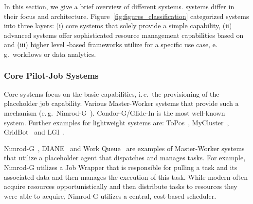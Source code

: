 \documentclass{sig-alternate}
\begin{document}
In this section, we give a brief overview of different \pilotjob systems.
\pilotjob systems differ in their focus and architecture.
Figure~\ref{fig:figures_classification} categorized \pilotjob systems into
three layers: (i) core \pilotjob systems that solely provide a simple \pilot
capability, (ii) advanced \pilotjob systems offer sophisticated resource
management capabilities based on \pilots and (iii) higher level \pilot-based
frameworks utilize \pilots for a specific use case, e.\,g.\ workflows or data
analytics.

\subsubsection{Core Pilot-Job Systems}


Core \pilotjob systems focus on the basic \pilot capabilities, i.\,e.\ the
provisioning of the placeholder job capability. Various Master-Worker systems
that provide such a mechanism (e.\,g.\
Nimrod-G~\cite{10.1109/HPC.2000.846563}). Condor-G/Glide-In is the most
well-known \pilotjob system. Further examples for lightweight \pilotjob
systems are: ToPos~\cite{topos},
MyCluster~\cite{Walker:2007:PAC:1285840.1285848},
GridBot~\cite{Silberstein:2009:GEB:1654059.1654071} and LGI~\cite{lgi}.

Nimrod-G~\cite{10.1109/HPC.2000.846563}, DIANE~\cite{diane-thesis} and Work
Queue~\cite{workqueue-pyhpc2011} are examples of Master-Worker systems that
utilize a placeholder agent that dispatches and manages tasks. For example,
Nimrod-G utilizes a Job Wrapper that is responsible for pulling a task and its
associated data and then manages the execution of this task. While modern
\pilotjobs often acquire resources opportunistically and then distribute tasks
to resources they were able to acquire, Nimrod-G utilizes a central,
cost-based scheduler.
\end{document}
